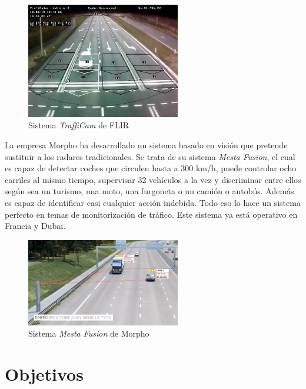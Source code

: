 \begin{figure}[H]
  \begin{center}
    \includegraphics[width=0.6\textwidth]{figures/Introduccion/flir.jpg}
		\caption{Sistema \textit{TraffiCam} de FLIR}
		\label{fig.flir}
		\end{center}
\end{figure}

La empresa Morpho ha desarrollado un sistema basado en visión que pretende sustituir a los radares tradicionales. Se trata de su sistema \textit{Mesta Fusion}, el cual es capaz de detectar coches que circulen hasta a 300 km/h, puede controlar ocho carriles al mismo tiempo, supervisar 32 vehículos a la vez y discriminar entre ellos según sea un turismo, una moto, una furgoneta o un camión o autobús. Además es capaz de identificar casi cualquier acción indebida.  Todo eso lo hace un sistema perfecto en temas de monitorización de tráfico. Este sistema ya está operativo en Francia y Dubai.

\begin{figure}[H]
  \begin{center}
    \includegraphics[width=0.6\textwidth]{figures/Introduccion/mesta_fusion.jpg}
		\caption{Sistema \textit{Mesta Fusion} de Morpho}
		\label{fig.mesta_fusion}
		\end{center}
\end{figure}

\section{Objetivos}

